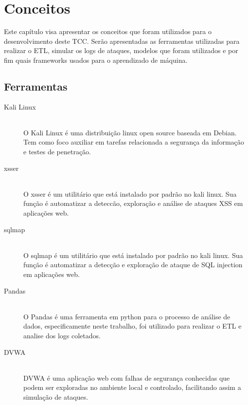 
\chapter{Conceitos}
\label{cap:concepts}

Este capítulo visa apresentar os conceitos que foram utilizados para o desenvolvimento deste TCC. Serão apresentadas as ferramentas utilizadas para realizar o ETL, simular os logs de ataques, modelos que foram utilizados e por fim quais frameworks usados para o aprendizado de máquina.

\section{Ferramentas}

\begin{description}
    \item[Kali Linux] \hfill \\ 
        O Kali Linux é uma distribuição linux open source baseada em Debian. Tem como foco auxiliar em tarefas relacionada a segurança da informação e testes de penetração.
    \item[xsser] \hfill \\ 
        O xsser é um utilitário que está instalado por padrão no kali linux. Sua função é automatizar a deteccão, exploração e análise de ataques XSS em aplicações web.
    \item[sqlmap] \hfill \\ 
        O sqlmap é um utilitário que está instalado por padrão no kali linux. Sua função é automatizar a detecção e exploração de ataque de SQL injection em aplicações web.
    \item[Pandas] \hfill \\ 
        O Pandas é uma ferramenta  em python para o processo de análise de dados, especificamente neste trabalho, foi utilizado para realizar o ETL e analise dos logs coletados.
    \item[DVWA] \hfill \\ 
        DVWA é uma aplicação web com falhas de segurança conhecidas que podem ser exploradas no ambiente local e controlado, facilitando assim a simulação de ataques.
  \end{description}

